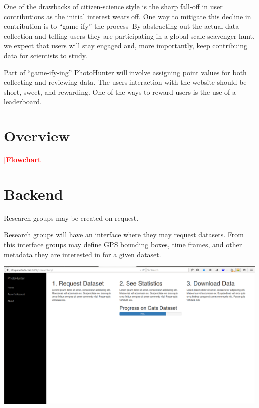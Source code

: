 \documentclass[aspectratio=169]{beamer}
\newcommand{\todo}[1]{\textcolor{red}{\textbf{[#1]}}}
\begin{document}
\begin{frame}
  One of the drawbacks of citizen-science style is the sharp fall-off
  in
  user contributions as the initial interest wears off. One way to
  mitigate this decline in contribution is to ``game-ify'' the
  process.
  By abstracting out the actual data collection and telling users they
  are participating in a global scale scavenger hunt, we expect that
  users will stay engaged and, more importantly, keep contribuing data
  for scientists to study.

  Part of ``game-ify-ing'' PhotoHunter will involve assigning point
  values for both collecting and reviewing data. The users interaction
  with the website should be short, sweet, and rewarding. One of the
  ways to reward users is the use of a leaderboard.
\end{frame}

\section{Overview}

\begin{frame}
  \todo{Flowchart}
\end{frame}

\section{Backend}

\begin{frame}
  Research groups may be created on request. 

  Research groups will have an interface where they may request
  datasets. From this interface groups may define GPS bounding boxes,
  time frames, and other metadata they are interested in for a given
  dataset.
\end{frame}

\begin{frame}
  \includegraphics[width=\columnwidth]{researchers}
\end{frame}
\end{document}
